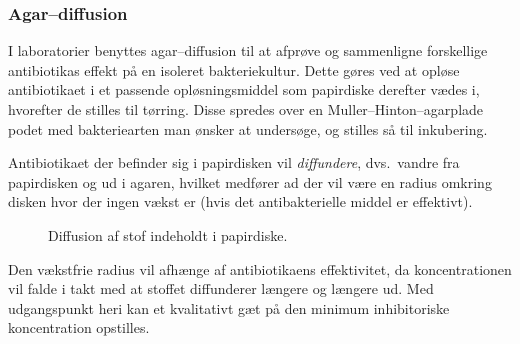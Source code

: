     \subsubsection{Agar--diffusion}
    I laboratorier benyttes agar--diffusion til at afprøve og sammenligne forskellige antibiotikas effekt på en isoleret bakteriekultur. Dette gøres ved at opløse antibiotikaet i et passende opløsningsmiddel som papirdiske derefter vædes i, hvorefter de stilles til tørring. Disse spredes over en Muller--Hinton--agarplade podet med bakteriearten man ønsker at undersøge, og stilles så til inkubering. 

    Antibiotikaet der befinder sig i papirdisken vil \textit{diffundere}, dvs.\ vandre fra papirdisken og ud i agaren, hvilket medfører ad der vil være en radius omkring disken hvor der ingen vækst er (hvis det antibakterielle middel er effektivt).
    \begin{figure}[H]\centering
        \caption{Diffusion af stof indeholdt i papirdiske.}
    \end{figure}
    Den vækstfrie radius vil afhænge af antibiotikaens effektivitet, da koncentrationen vil falde i takt med at stoffet diffunderer længere og længere ud. Med udgangspunkt heri kan et kvalitativt gæt på den minimum inhibitoriske koncentration opstilles.
